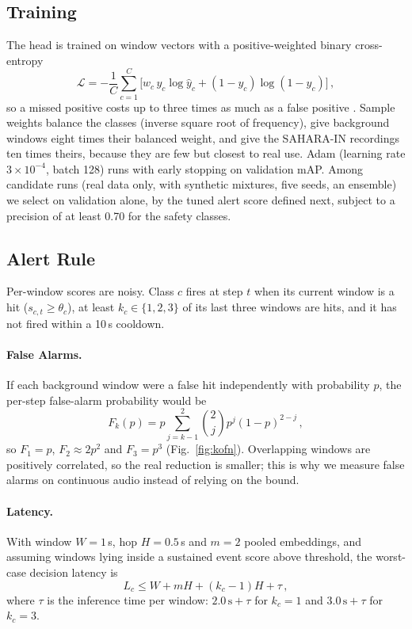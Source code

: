 \documentclass{svproc}
\begin{document}
\subsection{Training}
The head is trained on window vectors with a positive-weighted binary cross-entropy
\begin{equation}
\mathcal{L} = -\frac{1}{C}\sum_{c=1}^{C}\Big[w_c\,y_c\log\hat{y}_c + (1-y_c)\log(1-\hat{y}_c)\Big]\,,
\end{equation}
so a missed positive costs up to three times as much as a false positive \cite{elkan2001}. Sample weights balance the classes (inverse square root of frequency), give background windows eight times their balanced weight, and give the SAHARA-IN recordings ten times theirs, because they are few but closest to real use. Adam (learning rate $3\times10^{-4}$, batch 128) runs with early stopping on validation mAP. Among candidate runs (real data only, with synthetic mixtures, five seeds, an ensemble) we select on validation alone, by the tuned alert score defined next, subject to a precision of at least 0.70 for the safety classes.

\subsection{Alert Rule}\label{sec:policy}
Per-window scores are noisy. Class $c$ fires at step $t$ when its current window is a hit ($s_{c,t}\ge\theta_c$), at least $k_c\in\{1,2,3\}$ of its last three windows are hits, and it has not fired within a 10\,s cooldown.

\paragraph{False Alarms.} If each background window were a false hit independently with probability $p$, the per-step false-alarm probability would be
\begin{equation}
F_k(p)=p\sum_{j=k-1}^{2}\binom{2}{j}p^{j}(1-p)^{2-j}\,,
\end{equation}
so $F_1=p$, $F_2\approx 2p^2$ and $F_3=p^3$ (Fig.~\ref{fig:kofn}). Overlapping windows are positively correlated, so the real reduction is smaller; this is why we measure false alarms on continuous audio instead of relying on the bound.

\paragraph{Latency.} With window $W=1$\,s, hop $H=0.5$\,s and $m=2$ pooled embeddings, and assuming windows lying inside a sustained event score above threshold, the worst-case decision latency is
\begin{equation}
L_c \le W + mH + (k_c-1)H + \tau\,,
\end{equation}
where $\tau$ is the inference time per window: $2.0\,\mathrm{s}+\tau$ for $k_c=1$ and $3.0\,\mathrm{s}+\tau$ for $k_c=3$.
\end{document}
